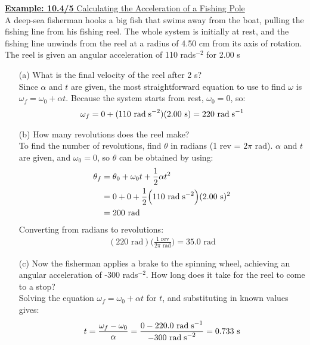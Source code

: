 \documentclass[a4paper]{article}
\let\bf\textbf
\begin{document}
\begin{shaded}
    \underline{\bf{Example: 10.4/5} Calculating the Acceleration of a Fishing Pole}
    \vspace{2mm}\\
    A deep-sea fisherman hooks a big fish that swims away from the boat, pulling the fishing line from his fishing reel. The whole system is initially at rest, and the fishing line unwinds from the reel at a radius of 4.50 cm from its axis of rotation. The reel is given an angular acceleration of 110 rad\;s$^{-2}$ for 2.00 s
    \begin{enumerate}
        \item[(a)] What is the final velocity of the reel after 2 s?
        \vspace{1mm}\\
        Since $\alpha$ and $t$ are given, the most straightforward equation to use to find $\omega$ is $\omega_f = \omega_0 + \alpha t$. Because the system starts from rest, $\omega_0 = 0$, so:
        \begin{align*}
            \omega_f = 0 + (110\text{ rad\;s}^{-2})(2.00\text{ s}) = 220\text{ rad\;s}^{-1}
        \end{align*}
        \item[(b)] How many revolutions does the reel make? 
        \vspace{1mm}\\
        To find the number of revolutions, find $\theta$ in radians (1 rev = $2\pi$ rad). $\alpha$ and $t$ are given, and $\omega_0 = 0$, so $\theta$ can be obtained by using:
        \begin{align*}
            \theta_f &= \theta_0 + \omega_0t + \frac{1}{2}\alpha t^2\\
            &= 0 + 0 + \frac{1}{2}\Big(110\text{ rad\;s}^{-2}\Big)(2.00\text{ s})^2\\
            &= 200\text{ rad}
        \end{align*}
        Converting from radians to revolutions:
        \begin{align*}
            (220\text{ rad})\bigg(\frac{1\text{ rev}}{2\pi\text{ rad}}\bigg) = 35.0\text{ rad}
        \end{align*}
        \item[(c)] Now the fisherman applies a brake to the spinning wheel, achieving an angular acceleration of -300 rad\;s$^{-2}$. How long does it take for the reel to come to a stop?
        \vspace{1mm}\\
        Solving the equation $\omega_f = \omega_0 + \alpha t$ for $t$, and substituting in known values gives:
        \begin{align*}
            t = \frac{\omega_f - \omega_0}{\alpha} = \frac{0 - 220.0\text{ rad\;s}^{-1}}{-300\text{ rad\;s}^{-2}} = 0.733\text{ s}
        \end{align*}
    \end{enumerate}
\end{shaded}
\end{document}
